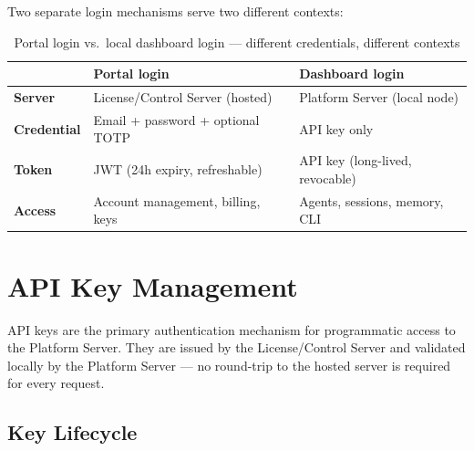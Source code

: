 Two separate login mechanisms serve two different contexts:

\begin{table}[H]
\centering
\renewcommand{\arraystretch}{1.4}
\begin{tabularx}{\textwidth}{@{}lXX@{}}
\toprule
 & \textbf{Portal login} & \textbf{Dashboard login} \\
\midrule
\textbf{Server}    & License/Control Server (hosted)    & Platform Server (local node) \\
\textbf{Credential}& Email + password + optional TOTP   & API key only \\
\textbf{Token}     & JWT (24h expiry, refreshable)       & API key (long-lived, revocable) \\
\textbf{Access}    & Account management, billing, keys  & Agents, sessions, memory, CLI \\
\bottomrule
\end{tabularx}
\caption{Portal login vs.\ local dashboard login — different credentials, different contexts}
\end{table}

\section{API Key Management}

API keys are the primary authentication mechanism for programmatic access to
the Platform Server. They are issued by the License/Control Server and
validated locally by the Platform Server — no round-trip to the hosted server
is required for every request.

\subsection{Key Lifecycle}

